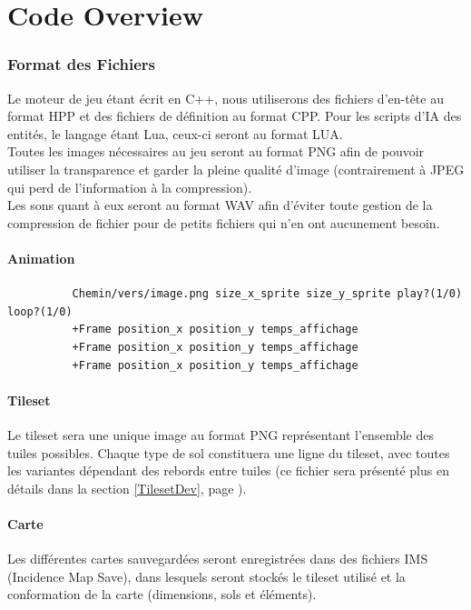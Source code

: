 \documentclass[a4paper]{article}
\newcommand{\alinea}{\hspace*{0.5cm}}
\begin{document}
\newpage
  \part{Code Overview}
    \section{Format des Fichiers}
	  \alinea Le moteur de jeu étant écrit en C++, nous utiliserons des fichiers d'en-tête au format HPP et des fichiers de définition au format CPP. Pour les scripts d'IA des entités, le langage étant Lua, ceux-ci seront au format LUA.\\
      \alinea Toutes les images nécessaires au jeu seront au format PNG afin de pouvoir utiliser la transparence et garder la pleine qualité d'image (contrairement à JPEG qui perd de l'information à la compression).\\
      \alinea Les sons quant à eux seront au format WAV afin d'éviter toute gestion de la compression de fichier pour de petits fichiers qui n'en ont aucunement besoin.

      \subsection{Animation}
        \begin{verbatim}
          Chemin/vers/image.png size_x_sprite size_y_sprite play?(1/0) loop?(1/0)
          +Frame position_x position_y temps_affichage
          +Frame position_x position_y temps_affichage
          +Frame position_x position_y temps_affichage
        \end{verbatim}
      
      \subsection{Tileset}
	    \alinea Le tileset sera une unique image au format PNG représentant l'ensemble des tuiles possibles. Chaque type de sol constituera une ligne du tileset, avec toutes les variantes dépendant des rebords entre tuiles (ce fichier sera présenté plus en détails dans la section \ref{TilesetDev}, page \pageref{TilesetDev}).

      \subsection{Carte}
	    \alinea Les différentes cartes sauvegardées seront enregistrées dans des fichiers IMS (Incidence Map Save), dans lesquels seront stockés le tileset utilisé et la conformation de la carte (dimensions, sols et éléments).
      
\end{document}
